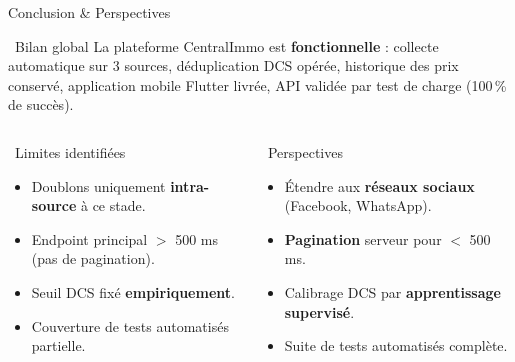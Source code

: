 \begin{frame}{Conclusion \& Perspectives}
  \begin{alertblock}{\faCheckCircle\ Bilan global}
    La plateforme CentralImmo est \textbf{fonctionnelle} : collecte automatique sur 3 sources, déduplication DCS opérée, historique des prix conservé, application mobile Flutter livrée, API validée par test de charge (100\,\% de succès).
  \end{alertblock}

  \vspace{0.4cm}
  \begin{columns}[T]
      \begin{block}{\faTimesCircle\ Limites identifiées}
        \footnotesize
        \begin{itemize}
          \item Doublons uniquement \textbf{intra-source} à ce stade.
          \item Endpoint principal $>$ 500 ms (pas de pagination).
          \item Seuil DCS fixé \textbf{empiriquement}.
          \item Couverture de tests automatisés partielle.
        \end{itemize}
      \end{block}
      \begin{block}{\faRocket\ Perspectives}
        \footnotesize
        \begin{itemize}
          \item Étendre aux \textbf{réseaux sociaux} (Facebook, WhatsApp).
          \item \textbf{Pagination} serveur pour $<$ 500 ms.
          \item Calibrage DCS par \textbf{apprentissage supervisé}.
          \item Suite de tests automatisés complète.
        \end{itemize}
      \end{block}
  \end{columns}
\end{frame}